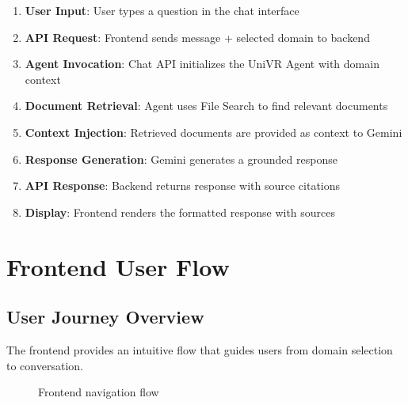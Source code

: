\documentclass[12pt,a4paper]{article}
\begin{document}
\begin{enumerate}
    \item \textbf{User Input}: User types a question in the chat interface
    \item \textbf{API Request}: Frontend sends message + selected domain to backend
    \item \textbf{Agent Invocation}: Chat API initializes the UniVR Agent with domain context
    \item \textbf{Document Retrieval}: Agent uses File Search to find relevant documents
    \item \textbf{Context Injection}: Retrieved documents are provided as context to Gemini
    \item \textbf{Response Generation}: Gemini generates a grounded response
    \item \textbf{API Response}: Backend returns response with source citations
    \item \textbf{Display}: Frontend renders the formatted response with sources
\end{enumerate}

\section{Frontend User Flow}

\subsection{User Journey Overview}

The frontend provides an intuitive flow that guides users from domain selection to conversation.

\begin{figure}[H]
    \centering
    \caption{Frontend navigation flow}
    \label{fig:frontend-flow}
\end{figure}
\end{document}
